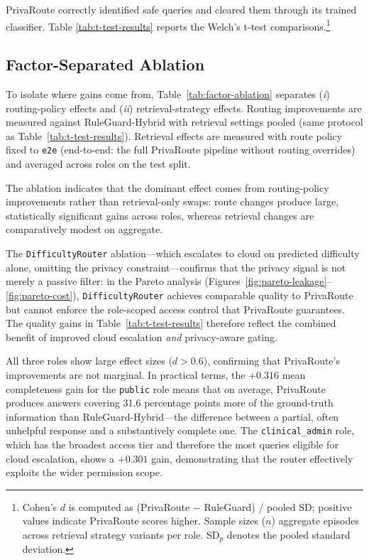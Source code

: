 \documentclass{article}
\newcommand{\code}[1]{{\small\texttt{#1}}}
\begin{document}
PrivaRoute correctly identified safe queries and cleared them through its trained classifier. Table \ref{tab:t-test-results} reports the Welch's t-test comparisons.\footnote{Cohen's $d$ is computed as (PrivaRoute $-$ RuleGuard) / pooled SD; positive values indicate PrivaRoute scores higher. Sample sizes ($n$) aggregate episodes across retrieval strategy variants per role. SD$_p$ denotes the pooled standard deviation.}


\subsection{Factor-Separated Ablation}
To isolate where gains come from, Table~\ref{tab:factor-ablation} separates
(\textit{i}) routing-policy effects and (\textit{ii}) retrieval-strategy effects.
Routing improvements are measured against RuleGuard-Hybrid with retrieval settings pooled
(same protocol as Table~\ref{tab:t-test-results}). Retrieval effects are measured with route
policy fixed to \code{e2e} (end-to-end: the full PrivaRoute pipeline without routing overrides) and averaged across roles on the test split.


The ablation indicates that the dominant effect comes from routing-policy improvements rather
than retrieval-only swaps: route changes produce large, statistically significant gains across
roles, whereas retrieval changes are comparatively modest on aggregate.

The \code{DifficultyRouter} ablation---which escalates to cloud on predicted difficulty alone, omitting the privacy constraint---confirms that the privacy signal is not merely a passive filter: in the Pareto analysis (Figures~\ref{fig:pareto-leakage}--\ref{fig:pareto-cost}), \code{DifficultyRouter} achieves comparable quality to PrivaRoute but cannot enforce the role-scoped access control that PrivaRoute guarantees. The quality gains in Table~\ref{tab:t-test-results} therefore reflect the combined benefit of improved cloud escalation \emph{and} privacy-aware gating.

All three roles show large effect sizes ($d > 0.6$), confirming that PrivaRoute's improvements are not marginal. In practical terms, the $+0.316$ mean completeness gain for the \code{public} role means that on average, PrivaRoute produces answers covering 31.6 percentage points more of the ground-truth information than RuleGuard-Hybrid---the difference between a partial, often unhelpful response and a substantively complete one. The \code{clinical\_admin} role, which has the broadest access tier and therefore the most queries eligible for cloud escalation, shows a $+0.301$ gain, demonstrating that the router effectively exploits the wider permission scope.
\end{document}
